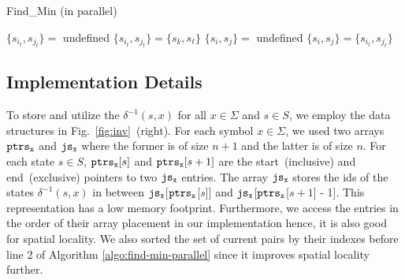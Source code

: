 \documentclass[12pt]{article}
\begin{document}
\begin{algorithm}[ht]
	\caption{Find\_Min (in parallel)}
	\label{algo:find-min-parallel}
	
	{
	$\{ s_{i_t},s_{j_t} \} =$ undefined
	}
	{
		{
			$\{ s_{i_t},s_{j_t} \} = \{ s_k, s_\ell \}$
		}
	}
	$\{ s_i,s_j \} =$ undefined\;
	{
		{
			$\{ s_i,s_j \} = \{ s_{i_t},s_{j_t} \}$
		}
	}
\end{algorithm}

\subsection{Implementation Details}\label{sec:implementation}
To store and utilize the  $\delta^{-1}(s,x)$ for all $x \in \Sigma$ and $s \in S$, we employ the data structures in Fig.~\ref{fig:inv}~(right). For each symbol $x \in \Sigma$, we used two arrays ${\tt ptrs_x}$ and ${\tt js_x}$ where the former is of size $n + 1$ and the latter is of size $n$. For each state $s \in S$, ${\tt ptrs_x}[s]$ and ${\tt ptrs_x}[s+1]$ are the start~(inclusive) and end~(exclusive) pointers to two ${\tt js_x}$ entries.  The array ${\tt js_x}$ stores the ids of the states $\delta^{-1}(s,x)$ in between ${\tt js_x}$[{$\tt ptrs_x$}[$s$]]  and ${\tt js_x}$[{$\tt ptrs_x$}[$s+1$] - 1]. This representation has a low memory footprint. Furthermore, we access the entries in the order of their array placement  in our implementation hence, it is also good for spatial locality. We also sorted the set of current pairs by their indexes before line 2 of Algorithm \ref{algo:find-min-parallel} since it improves spatial locality further.
\end{document}
